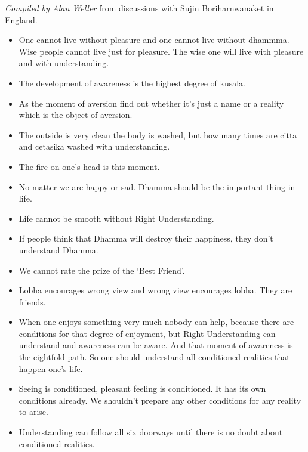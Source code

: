 \documentclass{article}
\begin{document}
\emph{Compiled by Alan Weller} from discussions with Sujin
Boriharnwanaket in England.

\begin{itemize}
\item 
  One cannot live without pleasure and one cannot live without
  dhammma. Wise people cannot live just for pleasure. The wise one
  will live with pleasure and with understanding.

\item 
  The development of awareness is the highest degree of kusala.

\item 
  As the moment of aversion find out whether it's just a name or a
  reality which is the object of aversion.

\item 
  The outside is very clean the body is washed, but how many times
  are citta and cetasika washed with understanding.

\item 
  The fire on one's head is this moment.

\item 
  No matter we are happy or sad. Dhamma should be the important thing
  in life.

\item 
  Life cannot be smooth without Right Understanding.

\item 
  If people think that Dhamma will destroy their happiness, they
  don't understand Dhamma.

\item 
  We cannot rate the prize of the `Best Friend'.

\item 
  Lobha encourages wrong view and wrong view encourages lobha. They
  are friends.

\item 
  When one enjoys something very much nobody can help, because there
  are conditions for that degree of enjoyment, but Right
  Understanding can understand and awareness can be aware. And that
  moment of awareness is the eightfold path. So one should understand
  all conditioned realities that happen one's life.

\item 
  Seeing is conditioned, pleasant feeling is conditioned. It has its
  own conditions already. We shouldn't prepare any other conditions
  for any reality to arise.

\item 
  Understanding can follow all six doorways until there is no doubt
  about conditioned realities.


\end{itemize}
\end{document}
